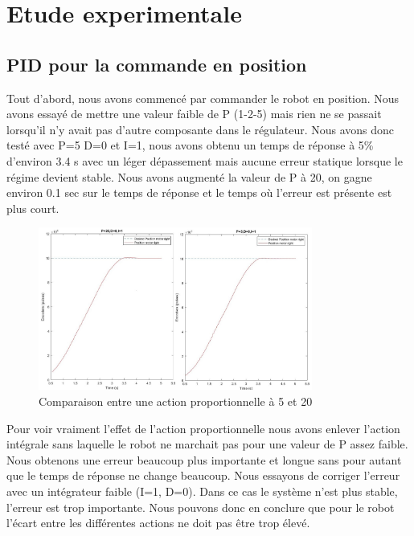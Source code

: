 \documentclass[a4paper]{article}
\begin{document}
	\section{Etude experimentale}
	\subsection{PID pour la commande en position}
		Tout d’abord, nous avons commencé par commander le robot en position.
		Nous avons essayé de mettre une valeur faible de P (1-2-5) mais rien ne se passait lorsqu’il n’y avait pas d’autre composante dans le régulateur. Nous avons donc testé avec P=5 D=0 et I=1, nous avons obtenu un temps de réponse à 5\% d’environ 3.4 s avec un léger dépassement mais aucune erreur statique lorsque le régime devient stable.
		Nous avons augmenté la valeur de P à 20, on gagne environ 0.1 sec sur le temps de réponse et le temps où l'erreur est présente est plus court.
		
		
		\begin{figure}[h]
			\centering
			\includegraphics[width = 9cm]{imgs/fig1.jpg}
			\caption{Comparaison entre une action proportionnelle à 5 et 20}
		\end{figure}
		Pour voir vraiment l’effet de l’action proportionnelle nous avons enlever l’action intégrale sans laquelle le robot ne marchait pas pour une valeur de P assez faible.
		Nous obtenons une erreur beaucoup plus importante et longue sans pour autant que le temps de réponse ne change beaucoup. Nous essayons de corriger l’erreur avec un intégrateur faible (I=1, D=0). Dans ce cas le système n’est plus stable, l’erreur est trop importante. Nous pouvons donc en conclure que pour le robot l’écart entre les différentes actions ne doit pas être trop élevé.
		
\end{document}
